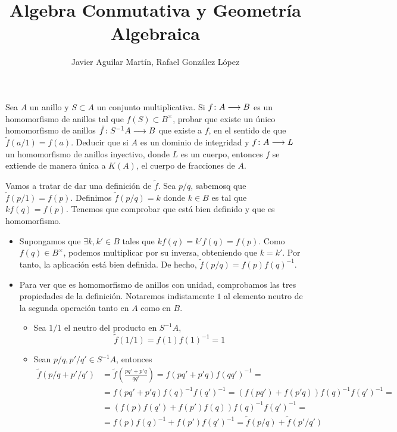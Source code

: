 \documentclass[twoside]{article}
\begin{document}
\title{Algebra Conmutativa y Geometría Algebraica}
\author{Javier Aguilar Martín, Rafael González López}
\maketitle

\begin{ejercicio}{1}
Sea $A$ un anillo y $S\subset A$ un conjunto multiplicativa. Si $f\colon{A}\longrightarrow{B}$ es un homomorfismo de anillos tal que $f(S)\subset B^\times$, probar que existe un único homomorfismo de anillos $\tilde{f}\colon{S^{-1}A}\longrightarrow{B}$ que existe a $f$, en el sentido de que $\tilde{f}(a/1) = f(a)$.
\newline
Deducir que si $A$ es un dominio de integridad y $f\colon{A}\longrightarrow{L}$ un homomorfismo de anillos inyectivo, donde $L$ es un cuerpo, entonces $f$ se extiende de manera única a $K(A)$, el cuerpo de fracciones de $A$.
\begin{solucion}
Vamos a tratar de dar una definición de $\tilde{f}$. Sea $p/q$, sabemosq que $\tilde{f}(p/1)=f(p)$. Definimos $\tilde{f}(p/q)=k$ donde $k\in B$ es tal que $kf(q)=f(p)$. Tenemos que comprobar que está bien definido y que es homomorfismo.
\begin{itemize}
\item Supongamos que $\exists k,k'\in B$ tales que $kf(q)=k'f(q)=f(p)$. Como $f(q)\in B^\times$, podemos multiplicar por su inversa, obteniendo que $k=k'$. Por tanto, la aplicación está bien definida. De hecho, $\tilde{f}(p/q)=f(p)f(q)^{-1}$.
\item Para ver que es homomorfismo de anillos con unidad, comprobamos las tres propiedades de la definición. Notaremos indistamente $1$ al elemento neutro de la segunda operación tanto en $A$ como en $B$.
\begin{itemize}
\item Sea $1/1$ el neutro del producto en $S^{-1}A$, 
$$\tilde{f}(1/1)=f(1)f(1)^{-1}=1$$
\item Sean $p/q,p'/q' \in S^{-1}A$, entonces
\begin{align*}
\tilde{f}(p/q+p'/q') &= 	\tilde{f}\left(\frac{pq'+p'q}{qq'}\right) = f(pq'+p'q)f(qq')^{-1} = \\
 &= f(pq'+p'q)f(q)^{-1}f(q')^{-1} =
(f(pq')+f(p'q))f(q)^{-1}f(q')^{-1} = \\
&= (f(p)f(q')+f(p')f(q))f(q)^{-1}f(q')^{-1}  =\\
 &= f(p)f(q)^{-1}+f(p')f(q')^{-1} = \tilde{f}(p/q)+\tilde{f}(p'/q')
\end{align*}


\end{itemize}
\end{itemize}
\end{solucion}
\end{ejercicio}
\end{document}
